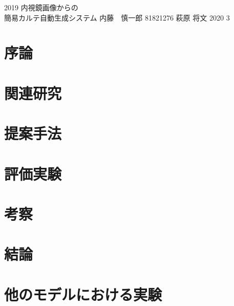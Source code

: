 \documentclass[a4j,12pt]{jreport}
\begin{document}
\begin{titlepage}
\thesis
{2019}                %
{内視鏡画像からの\\簡易カルテ自動生成システム}       %
{内藤　慎一郎}                %
{81821276}          %
{萩原 将文}         %
{2020}                %
{3} %
\end{titlepage}


\renewcommand{\thepage}{--\roman{page}--}

\jabstract


\eabstract{} %


\contents


\chapter{序論}


\chapter{関連研究}


\chapter{提案手法}


\chapter{評価実験}


\chapter{考察}


\chapter{結論}




\acknowledgment





\appendix
\chapter{他のモデルにおける実験}

\end{document}
